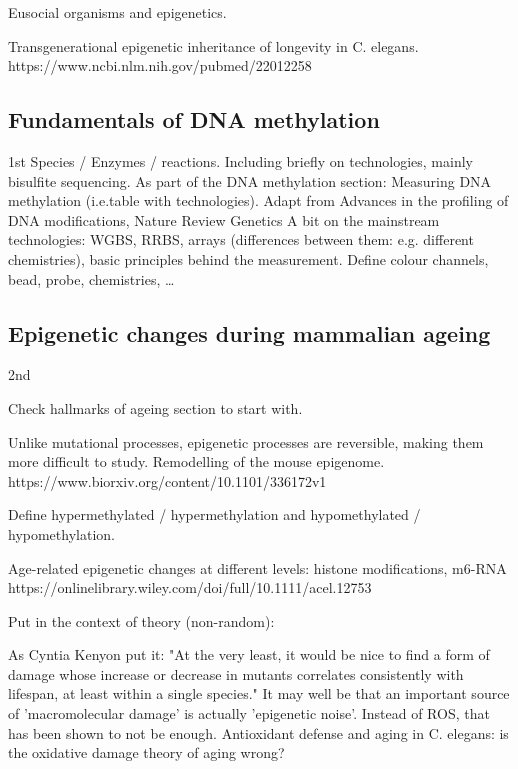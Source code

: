 Eusocial organisms and epigenetics.

Transgenerational epigenetic inheritance of longevity in C. elegans.
https://www.ncbi.nlm.nih.gov/pubmed/22012258


\subsection{Fundamentals of DNA methylation}

1st
Species / Enzymes / reactions.
Including briefly on technologies, mainly bisulfite sequencing.
As part of the DNA methylation section: Measuring DNA methylation (i.e.table with technologies). Adapt from Advances in the profiling of DNA modifications, Nature Review Genetics
A bit on the mainstream technologies: WGBS, RRBS, arrays (differences between them: e.g. different chemistries), basic principles behind the measurement. Define colour channels, bead, probe, chemistries, …

\subsection{Epigenetic changes during mammalian ageing}

2nd

Check hallmarks of ageing section to start with.

Unlike mutational processes, epigenetic processes are reversible, making them more difficult to study.
Remodelling of the mouse epigenome. 
https://www.biorxiv.org/content/10.1101/336172v1

Define hypermethylated / hypermethylation and hypomethylated / hypomethylation.

Age-related epigenetic changes at different levels: histone modifications, m6-RNA https://onlinelibrary.wiley.com/doi/full/10.1111/acel.12753

Put in the context of theory (non-random): %


As Cyntia Kenyon put it: "At the very least, it would be nice to find a form of damage whose increase or decrease in mutants correlates consistently with lifespan, at least within a single species." \cite{Kenyon2010}
It may well be that an important source of 'macromolecular damage' is actually 'epigenetic noise'. 
Instead of ROS, that has been shown to not be enough. 
Antioxidant defense and aging in C. elegans: is the oxidative damage theory of aging wrong?

